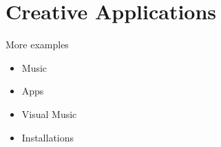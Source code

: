 
\chapter{Creative Applications}
\label{examples}

More examples
\begin{itemize}
\item Music
\item Apps
\item Visual Music
\item Installations


\end{itemize}
